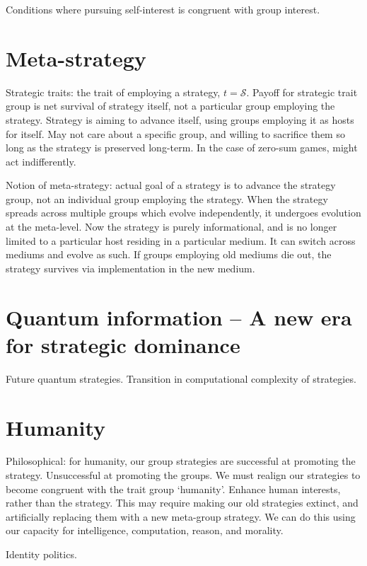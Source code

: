 \documentclass[aps,rmp,twocolumn,amsmath,amssymb,nofootinbib,superscriptaddress]{revtex4}
\begin{document}
Conditions where pursuing self-interest is congruent with group interest.

\section{Meta-strategy}

Strategic traits: the trait of employing a strategy, $t=\mathcal{S}$. Payoff for strategic trait group is net survival of strategy itself, not a particular group employing the strategy. Strategy is aiming to advance itself, using groups employing it as hosts for itself. May not care about a specific group, and willing to sacrifice them so long as the strategy is preserved long-term. In the case of zero-sum games, might act indifferently.

Notion of meta-strategy: actual goal of a strategy is to advance the strategy group, not an individual group employing the strategy. When the strategy spreads across multiple groups which evolve independently, it undergoes evolution at the meta-level. Now the strategy is purely informational, and is no longer limited to a particular host residing in a particular medium. It can switch across mediums and evolve as such. If groups employing old mediums die out, the strategy survives via implementation in the new medium.

\section{Quantum information -- A new era for strategic dominance}

Future quantum strategies. Transition in computational complexity of strategies.

\section{Humanity}

Philosophical: for humanity, our group strategies are successful at promoting the strategy. Unsuccessful at promoting the groups. We must realign our strategies to become congruent with the trait group `humanity'. Enhance human interests, rather than the strategy. This may require making our old strategies extinct, and artificially replacing them with a new meta-group strategy. We can do this using our capacity for intelligence, computation, reason, and morality.

Identity politics.
\end{document}
